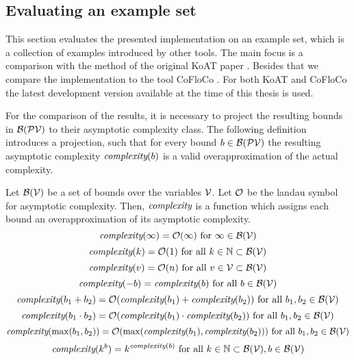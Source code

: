 \iffalse

\fi

\subsection{Evaluating an example set}

This section evaluates the presented implementation on an example set, which is a collection of examples introduced by other tools.
The main focus is a comparison with the method of the original KoAT paper \cite{koat}.
Besides that we compare the implementation to the tool CoFloCo \cite{cofloco3}.
For both KoAT and CoFloCo the latest development version available at the time of this thesis is used.

For the comparison of the results, it is necessary to project the resulting bounds in $\mathcal{B}(\mathcal{PV})$ to their asymptotic complexity class.
The following definition introduces a projection, such that for every bound $b \in \mathcal{B}(\mathcal{PV})$ the resulting asymptotic complexity $\emph{complexity}(b)$ is a valid overapproximation of the actual complexity.

\begin{definition}
  Let $\mathcal{B}(\mathcal{V})$ be a set of bounds over the variables $\mathcal{V}$.
  Let $\mathcal{O}$ be the landau symbol for asymptotic complexity.
  Then, $\emph{complexity}$ is a function which assigns each bound an overapproximation of its asymptotic complexity.
  \[ \emph{complexity}(\infty) = \mathcal{O}(\infty) \text{ for } \infty \in \mathcal{B}(\mathcal{V}) \]
  \[ \emph{complexity}(k) = \mathcal{O}(1) \text{ for all } k \in \mathbb{N} \subset \mathcal{B}(\mathcal{V}) \] 
  \[ \emph{complexity}(v) = \mathcal{O}(n) \text{ for all } v \in \mathcal{V} \subset \mathcal{B}(\mathcal{V}) \] 
  \[ \emph{complexity}(-b) = \emph{complexity}(b) \text{ for all } b \in \mathcal{B}(\mathcal{V}) \] 
  \[ \emph{complexity}(b_1 + b_2) = \mathcal{O}(\emph{complexity}(b_1) + \emph{complexity}(b_2)) \text{ for all } b_1, b_2 \in \mathcal{B}(\mathcal{V}) \] 
  \[ \emph{complexity}(b_1 \cdot b_2) = \mathcal{O}(\emph{complexity}(b_1) \cdot \emph{complexity}(b_2)) \text{ for all } b_1, b_2 \in \mathcal{B}(\mathcal{V}) \] 
  \[ \emph{complexity}(\max(b_1, b_2)) = \mathcal{O}(\max(\emph{complexity}(b_1), \emph{complexity}(b_2))) \text{ for all } b_1, b_2 \in \mathcal{B}(\mathcal{V}) \]
  \[ \emph{complexity}(k^b) = k^{\emph{complexity}(b)} \text{ for all } k \in \mathbb{N} \subset \mathcal{B}(\mathcal{V}), b \in \mathcal{B}(\mathcal{V}) \]  
\end{definition}

